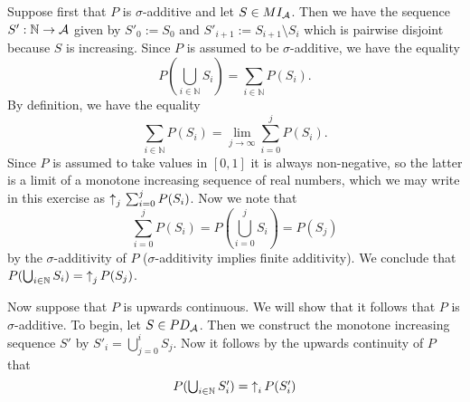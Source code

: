 \documentclass{article}
\begin{document}
\begin{ex}
Suppose first that $P$ is $\sigma$-additive and let $S\in MI_\mathcal{A}$. Then we have the sequence $S':\mathbb{N}\to\mathcal{A}$ given by $S'_0:=S_0$ and $S'_{i+1}:=S_{i+1}\setminus S_i$ which is pairwise disjoint because $S$ is increasing. Since $P$ is assumed to be $\sigma$-additive, we have the equality
\begin{equation*}
\textstyle
P(\bigcup_{i\in\mathbb{N}}S_i)=\sum_{i\in\mathbb{N}}P(S_i).
\end{equation*}
By definition, we have the equality
\begin{equation*}
\sum_{i\in\mathbb{N}}P(S_i)=\lim_{j\to\infty}\sum_{i=0}^j P(S_i).
\end{equation*}
Since $P$ is assumed to take values in $[0,1]$ it is always non-negative, so the latter is a limit of a monotone increasing sequence of real numbers, which we may write in this exercise as ${\uparrow}_j\,\sum_{i=0}^j P(S_i)$. Now we note that 
\begin{equation*}
\textstyle
\sum_{i=0}^j P(S_i) = P(\bigcup_{i=0}^j S_i) = P(S_j)
\end{equation*}
by the $\sigma$-additivity of $P$ ($\sigma$-additivity implies finite additivity). We conclude that $P(\bigcup_{i\in\mathbb{N}}S_i)={\uparrow}_{j}\,{P(S_j)}$.

Now suppose that $P$ is upwards continuous. We will show that it follows that $P$ is $\sigma$-additive. To begin, let $S\in PD_\mathcal{A}$. Then we construct the monotone increasing sequence $S'$ by $S'_i=\bigcup_{j=0}^i S_j$. Now it follows by the upwards continuity of $P$ that
\begin{equation*}
\textstyle
P(\bigcup_{i\in\mathbb{N}}S'_i)={\uparrow}_{i}\,{P(S'_i)}
\end{equation*}

\end{ex}
\end{document}
